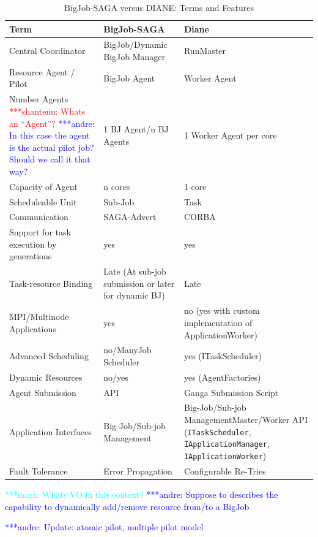 \documentclass[conference,final]{IEEEtran}
\newcommand{\jhanote}[1]{ {\textcolor{red} { ***shantenu: #1 }}}
\newcommand{\alnote}[1]{ {\textcolor{blue} { ***andre: #1 }}}
\newcommand{\msnote}[1]{ {\textcolor{cyan} { ***mark: #1 }}}
\newcommand{\alnote}[1]{}
\newcommand{\jhanote}[1]{}
\newcommand{\msnote}[1]{}
\begin{document}
\begin{table}[t]
\centering
\begin{tabular}{|p{3.5cm}|p{5.9cm}|p{5.7cm}|}
\hline
\textbf{Term} &\textbf{BigJob-SAGA} &\textbf{Diane}  \\
\hline
Central Coordinator &BigJob/Dynamic BigJob Manager & RunMaster \\ 
\hline
Resource Agent / Pilot &BigJob Agent  & Worker Agent \\
\hline
Number Agents \jhanote{Whats an ``Agent''?}  \alnote{In this case the agent is 
the actual pilot job? Should we call it that way?} &1 BJ Agent/n BJ Agents & 1 
Worker Agent per core \\
\hline
Capacity of Agent &n cores & 1 core\\
\hline
Scheduleable Unit&Sub-Job &  Task \\
\hline
Communication &SAGA-Advert & CORBA\\
\hline
Support for task execution by generations  &yes &yes\\  
\hline
Task-resource Binding &Late (At sub-job submission or later for dynamic BJ) &Late\\
\hline
MPI/Multinode Applications &yes &no (yes with custom implementation of ApplicationWorker)\\
\hline
Advanced Scheduling &no/ManyJob Scheduler &yes (ITaskScheduler)\\
\hline
Dynamic Resources &no/yes &yes (AgentFactories)\\
\hline
Agent Submission &API &Ganga Submission Script\\
\hline
Application Interfaces &Big-Job/Sub-job Management &Big-Job/Sub-job 
Management\linebreak[4] Master/Worker API (\texttt{ITaskScheduler}, 
\texttt{IApplicationManager}, \texttt{IApplicationWorker}) \\
\hline
Fault Tolerance &Error Propagation &Configurable Re-Tries\\
\hline
\end{tabular}
\caption{BigJob-SAGA versus DIANE: Terms and Features} \label{table:bigjob-saga-diane}
\end{table}

\msnote{Whats VO in this context?}\alnote{Suppose to describes the capability to dynamically add/remove resource from/to a BigJob}


\alnote{Update: atomic pilot, multiple pilot model}


\end{document}

